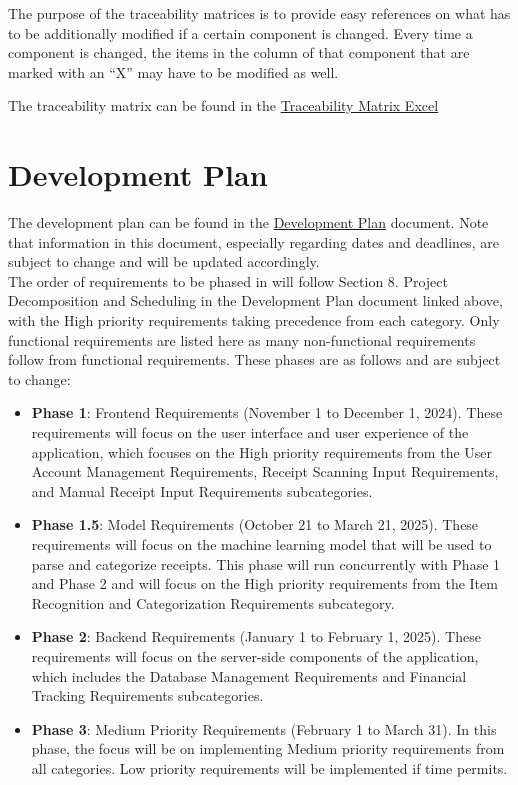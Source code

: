\documentclass[12pt]{article}
\begin{document}
The purpose of the traceability matrices is to provide easy references on what
has to be additionally modified if a certain component is changed.  Every time a
component is changed, the items in the column of that component that are marked
with an ``X'' may have to be modified as well. 

\noindent The traceability matrix can be found in the \href{https://github.com/PlutosCapstone/Plutos/blob/main/docs/SRS/traceability_matrix.xlsx}{Traceability Matrix Excel}

\newpage

\section{Development Plan}

The development plan can be found in the
\href{https://github.com/PlutosCapstone/Plutos/blob/main/docs/DevelopmentPlan/DevelopmentPlan.pdf}{Development
Plan} document. Note that information in this document, especially regarding dates and deadlines, are subject to change and will be updated accordingly. \\

The order of requirements to be phased in will follow Section 8. Project Decomposition and Scheduling in the Development Plan document linked above, with the High priority requirements taking precedence from each category. Only functional requirements are listed here as many non-functional requirements follow from functional requirements. These phases are as follows and are subject to change:
\begin{itemize}
  \item \textbf{Phase 1}: Frontend Requirements (November 1 to December 1,
  2024). These requirements will focus on the user interface and user experience
  of the application, which focuses on the High priority requirements from the
  User Account Management Requirements, Receipt Scanning Input Requirements, and
  Manual Receipt Input Requirements subcategories.
  \item \textbf{Phase 1.5}: Model Requirements (October 21 to March 21, 2025).
  These requirements will focus on the machine learning model that will be used
  to parse and categorize receipts. This phase will run concurrently with Phase
  1 and Phase 2 and will focus on the High priority requirements from the Item
  Recognition and Categorization Requirements subcategory.
  \item \textbf{Phase 2}: Backend Requirements (January 1 to February 1, 2025).
  These requirements will focus on the server-side components of the
  application, which includes the Database Management Requirements and Financial
  Tracking Requirements subcategories.
  \item \textbf{Phase 3}: Medium Priority Requirements (February 1 to March 31).
  In this phase, the focus will be on implementing Medium priority requirements
  from all categories. Low priority requirements will be implemented if time
  permits.
\end{itemize}
\end{document}
